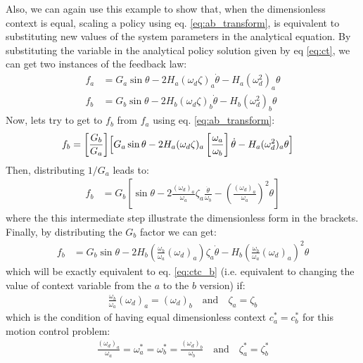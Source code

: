 Also, we can again use this example to show that, when the dimensionless context is equal, scaling a policy using eq. \eqref{eq:ab_transform}, is equivalent to substituting new values of the system parameters in the analytical equation. By substituting the variable in the analytical policy solution given by eq \eqref{eq:ct}, we can get two instances of the feedback law:
\begin{align}
f_a &= G_a \sin \theta - 2 H_a (\omega_d \zeta )_a \dot{\theta} - H_a( \omega_d^2)_a \theta \label{eq:ctc_a} \\
f_b &= G_b \sin \theta - 2 H_b (\omega_d \zeta )_b \dot{\theta} - H_b( \omega_d^2)_b \theta
\label{eq:ctc_b}
\end{align}
Now, lets try to get to $f_b$ from $f_a$ using eq. \eqref{eq:ab_transform}:
\begin{align}
f_b &= \left[ \frac{G_b}{G_a} \right] \Bigr[  G_a \sin \theta - 2 H_a ( \omega_d \zeta )_a \left[\frac{\omega_a}{\omega_b} \right] \dot{\theta}  - H_a ( \omega_d^2)_a \theta \Bigl]  
\end{align}
Then, distributing $1/G_a$ leads to:
\begin{align}
f_b &= G_b \left[  \sin \theta - 2 \frac{(\omega_d )_a }{\omega_a } \zeta_a \frac{\dot{ \theta }}{\omega_b} - \left(\frac{(\omega_d )_a }{\omega_a }\right)^2 \theta \right]
\end{align}
where the this intermediate step illustrate the dimensionless form in the brackets. Finally, by distributing the $G_b$ factor we can get:
\begin{align}
f_b &= G_b  \sin \theta - 2 H_b  
\left( \frac{\omega_b}{\omega_a} (\omega_d )_a
\right) \zeta_a \dot{ \theta }
- H_b 
\left( 
\frac{\omega_b}{\omega_a} (\omega_d)_a 
\right)^2 
\theta
\end{align}
which will be exactly equivalent to eq. \eqref{eq:ctc_b} (i.e. equivalent to changing the value of context variable from the $a$ to the $b$ version) if:
\begin{align}
\frac{\omega_b}{\omega_a} (\omega_d )_a = (\omega_d )_b 
\quad \text{and}  \quad \zeta_a = \zeta_b
\end{align}
which is the condition of having equal dimensionless context $c_a^* = c_b^*$ for this motion control problem:
\begin{align}
\frac{(\omega_d )_a}{\omega_a}  = \omega^*_a =  \omega^*_b = \frac{(\omega_d )_b}{\omega_b} 
\quad \text{and}  \quad \zeta_a^* = \zeta_b^*
\end{align}




